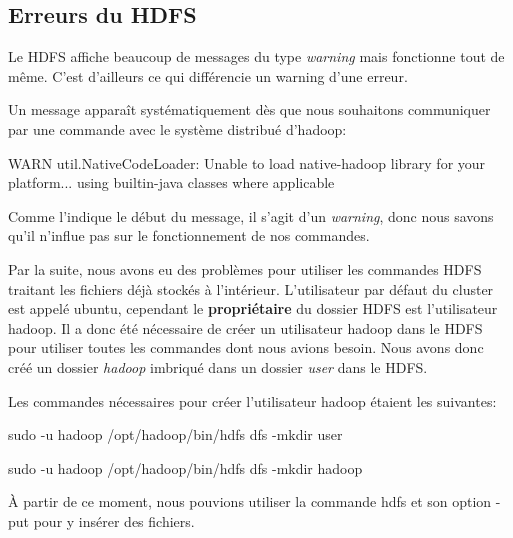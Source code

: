 \subsection{Erreurs du HDFS}

Le HDFS affiche beaucoup de messages du type \textit{warning} mais fonctionne tout de même. C'est d'ailleurs ce qui différencie un warning d'une erreur.\par
\vspace{1\baselineskip}

Un message apparaît systématiquement dès que nous souhaitons communiquer par une commande avec le système distribué d'hadoop:
\vspace{0.5\baselineskip}

\begin{ttfamily}
WARN util.NativeCodeLoader: Unable to load native-hadoop library for your platform... using builtin-java classes where applicable
\end{ttfamily}\par
\vspace{0.5\baselineskip}

Comme l'indique le début du message, il s'agit d'un \textit{warning}, donc nous savons qu'il n'influe pas sur le fonctionnement de nos commandes.\par
\vspace{1\baselineskip}

Par la suite, nous avons eu des problèmes pour utiliser les commandes HDFS traitant les fichiers déjà stockés à l'intérieur. L'utilisateur par défaut du cluster est appelé ubuntu, cependant le \textbf{propriétaire} du dossier HDFS est l'utilisateur hadoop. Il a donc été nécessaire de créer un utilisateur hadoop dans le HDFS pour utiliser toutes les commandes dont nous avions besoin. Nous avons donc créé un dossier \textit{hadoop} imbriqué dans un dossier \textit{user} dans le HDFS.\par
Les commandes nécessaires pour créer l'utilisateur hadoop étaient les suivantes:\par
\vspace{0.5\baselineskip}

\begin{ttfamily}
sudo -u hadoop /opt/hadoop/bin/hdfs dfs -mkdir user\par
sudo -u hadoop /opt/hadoop/bin/hdfs dfs -mkdir hadoop
\end{ttfamily}\par
\vspace{0.5\baselineskip}
\`A partir de ce moment, nous pouvions utiliser la commande hdfs et son option -put pour y insérer des fichiers.
\vspace{1\baselineskip}

